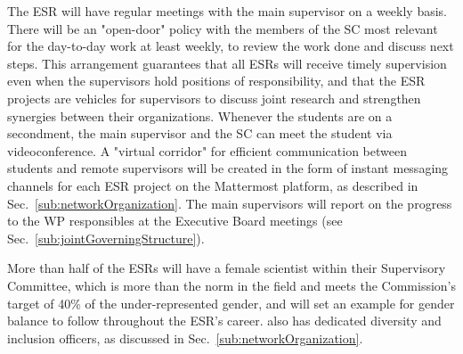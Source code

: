 The ESR will have regular meetings with the main supervisor on a weekly basis. 
There will be an "open-door" policy with the members of the SC most relevant for the day-to-day work at least weekly, to review the work done and discuss next steps. 
This arrangement guarantees that all ESRs will receive timely supervision even when the supervisors hold positions of responsibility, and that the ESR projects are vehicles for supervisors to discuss joint research and strengthen synergies between their organizations.  
Whenever the students are on a secondment, the main supervisor and the SC can meet the student via videoconference. 
A "virtual corridor" for efficient communication between students and remote supervisors will be created in the form of instant messaging channels for each ESR project on the Mattermost platform, as described in Sec.~\ref{sub:networkOrganization}. 
The main supervisors will report on the progress to the WP responsibles at the Executive Board meetings (see Sec.~\ref{sub:jointGoverningStructure}). 


More than half of the ESRs will have a female scientist within their Supervisory Committee, which is more than the norm in the field and meets the Commission's target of 40\% of the under-represented gender, and will set an example for gender balance to follow throughout the ESR's career. \acronym also has dedicated diversity and inclusion officers, as discussed in Sec.~\ref{sub:networkOrganization}. 
